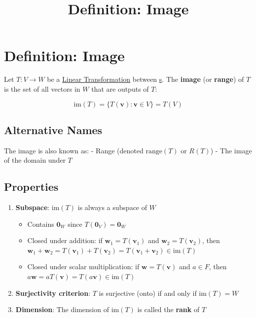 \documentclass[
  11pt,
  a4paper,
]{article}
\title{Definition: Image}
\author{}
\date{}
\providecommand{\tightlist}{%
  \setlength{\itemsep}{0pt}\setlength{\parskip}{0pt}}
\begin{document}
\maketitle


\section{Definition: Image}\label{def-image}

Let \(T: V \to W\) be a \href{def-linear-transformation.qmd}{Linear
Transformation} between \href{def-vector-space.qmd}{s}. The
\textbf{image} (or \textbf{range}) of \(T\) is the set of all vectors in
\(W\) that are outputs of \(T\):

\[\text{im}(T) = \{T(\mathbf{v}) : \mathbf{v} \in V\} = T(V)\]

\subsection{Alternative Names}\label{alternative-names}

The image is also known as: - Range (denoted \(\text{range}(T)\) or
\(R(T)\)) - The image of the domain under \(T\)

\subsection{Properties}\label{properties}

\begin{enumerate}
\def\labelenumi{\arabic{enumi}.}
\item
  \textbf{Subspace}: \(\text{im}(T)\) is always a subspace of \(W\)

  \begin{itemize}
  \tightlist
  \item
    Contains \(\mathbf{0}_W\) since \(T(\mathbf{0}_V) = \mathbf{0}_W\)
  \item
    Closed under addition: if \(\mathbf{w}_1 = T(\mathbf{v}_1)\) and
    \(\mathbf{w}_2 = T(\mathbf{v}_2)\), then
    \(\mathbf{w}_1 + \mathbf{w}_2 = T(\mathbf{v}_1) + T(\mathbf{v}_2) = T(\mathbf{v}_1 + \mathbf{v}_2) \in \text{im}(T)\)
  \item
    Closed under scalar multiplication: if
    \(\mathbf{w} = T(\mathbf{v})\) and \(a \in F\), then
    \(a\mathbf{w} = aT(\mathbf{v}) = T(a\mathbf{v}) \in \text{im}(T)\)
  \end{itemize}
\item
  \textbf{Surjectivity criterion}: \(T\) is surjective (onto) if and
  only if \(\text{im}(T) = W\)
\item
  \textbf{Dimension}: The dimension of \(\text{im}(T)\) is called the
  \textbf{rank} of \(T\)
\end{enumerate}
\end{document}
